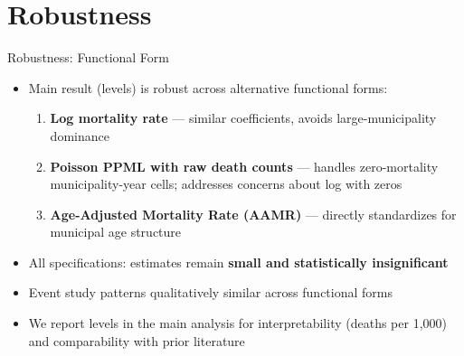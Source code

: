 \documentclass[aspectratio=169,usenames,dvipsnames]{beamer}
\newcommand{\smallcite}[1]{{\footnotesize\textcolor{Blue}{\citep{#1}}}}
\begin{document}

\section{Robustness}

\begin{frame}{Robustness: Functional Form}\label{robustness_ff}
\small
\begin{itemize}
  \item[$\circ$] Main result (levels) is robust across alternative functional forms:
    \vspace{4pt}
    \begin{enumerate}
      \item \textbf{Log mortality rate} --- similar coefficients, avoids large-municipality dominance
      \vspace{4pt}
      \item \textbf{Poisson PPML with raw death counts} --- handles zero-mortality municipality-year cells; addresses \smallcite{ChenRoth2024QJE} concerns about log with zeros
      \vspace{4pt}
      \item \textbf{Age-Adjusted Mortality Rate (AAMR)} --- directly standardizes for municipal age structure
    \end{enumerate}
  \vspace{8pt}
  \item[$\circ$] All specifications: estimates remain \textbf{small and statistically insignificant}
  \vspace{8pt}
  \item[$\circ$] Event study patterns qualitatively similar across functional forms
  \vspace{8pt}
  \item[$\circ$] We report levels in the main analysis for interpretability (deaths per 1,000) and comparability with prior literature
\end{itemize}
\end{frame}
\end{document}
